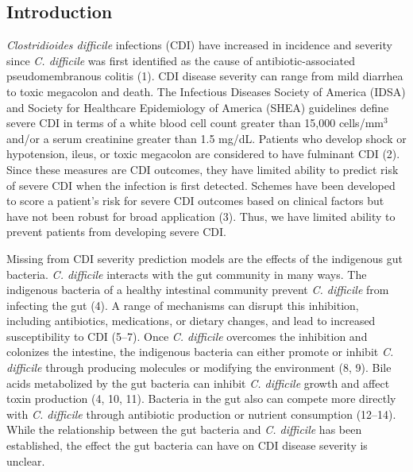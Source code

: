 \documentclass[
  12pt,
]{article}
\begin{document}
\newpage

\hypertarget{introduction}{%
\subsection{Introduction}\label{introduction}}

\emph{Clostridioides difficile} infections (CDI) have increased in
incidence and severity since \emph{C. difficile} was first identified as
the cause of antibiotic-associated pseudomembranous colitis (1). CDI
disease severity can range from mild diarrhea to toxic megacolon and
death. The Infectious Diseases Society of America (IDSA) and Society for
Healthcare Epidemiology of America (SHEA) guidelines define severe CDI
in terms of a white blood cell count greater than 15,000 cells/mm\(^3\)
and/or a serum creatinine greater than 1.5 mg/dL. Patients who develop
shock or hypotension, ileus, or toxic megacolon are considered to have
fulminant CDI (2). Since these measures are CDI outcomes, they have
limited ability to predict risk of severe CDI when the infection is
first detected. Schemes have been developed to score a patient's risk
for severe CDI outcomes based on clinical factors but have not been
robust for broad application (3). Thus, we have limited ability to
prevent patients from developing severe CDI.

Missing from CDI severity prediction models are the effects of the
indigenous gut bacteria. \emph{C. difficile} interacts with the gut
community in many ways. The indigenous bacteria of a healthy intestinal
community prevent \emph{C. difficile} from infecting the gut (4). A
range of mechanisms can disrupt this inhibition, including antibiotics,
medications, or dietary changes, and lead to increased susceptibility to
CDI (5--7). Once \emph{C. difficile} overcomes the inhibition and
colonizes the intestine, the indigenous bacteria can either promote or
inhibit \emph{C. difficile} through producing molecules or modifying the
environment (8, 9). Bile acids metabolized by the gut bacteria can
inhibit \emph{C. difficile} growth and affect toxin production (4, 10,
11). Bacteria in the gut also can compete more directly with \emph{C.
difficile} through antibiotic production or nutrient consumption
(12--14). While the relationship between the gut bacteria and \emph{C.
difficile} has been established, the effect the gut bacteria can have on
CDI disease severity is unclear.
\end{document}
